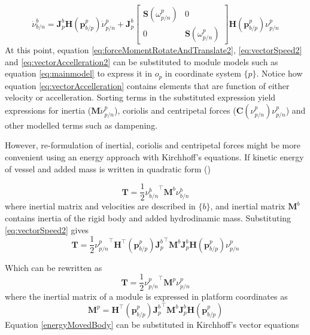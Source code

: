 \begin{equation}
\dot{\nu}_{b/n}^{b} = \textbf{J}_{p}^{b}  \textbf{H}(\textbf{p}_{b/p}^{p}) \dot{\nu}_{p/n}^{p}  + \textbf{J}_{p}^{b} \begin{bmatrix}\textbf{S}(\omega_{p/n}^{p})&0\\0&\textbf{S}(\omega_{p/n}^{p})    \end{bmatrix}\textbf{H}(\textbf{p}_{b/p}^{p}) \nu_{p/n}^{p}
\label{eq:vectorAccelleration2}
\end{equation}
At this point, equation \ref{eq:forceMomentRotateAndTranslate2}, \ref{eq:vectorSpeed2} and \ref{eq:vectorAccelleration2} can be substituted to module models such as equation \ref{eq:mainmodel} to express it in $o_{p}$ in coordinate system $\{p\}$. Notice how equation \ref{eq:vectorAccelleration} contains elements that are function of either velocity or accelleration. Sorting terms in the substituted expression yield expressions for inertia ($\textbf{M}\dot{\nu}_{p/n}^{p}$), coriolis and centripetal forces ($\textbf{C}(\nu_{p/n}^{p})\nu_{p/n}^{p}$) and other modelled terms such as dampening.


However, re-formulation of inertial, coriolis and centripetal forces might be more convenient using an energy approach with Kirchhoff’s equations. If kinetic energy of vessel and added mass is written in quadratic form (\citet{kirchhoff1869bewegung})

\begin{equation}
	\textbf{T} = \frac{1}{2} {\nu_{b/n}^{b}}^{\top} \textbf{M}^{b} \nu_{b/n}^{b}
\end{equation}
where inertial matrix and velocities are described in $\{b\}$, and inertial matrix $\textbf{M}^{b}$ contains inertia of the rigid body and added hydrodinamic mass. Substituting \ref{eq:vectorSpeed2} gives
\begin{equation}
\textbf{T} = \frac{1}{2} {\nu_{p/n}^{p}}^{\top} \textbf{H}^{\top}(\textbf{p}_{b/p}^{p}){\textbf{J}_{p}^{b}}^{\top}  \textbf{M}^{b} \textbf{J}_{p}^{b} \textbf{H}(\textbf{p}_{b/p}^{p}) \nu_{p/n}^{p}
\end{equation}

Which can be rewritten as
\begin{equation}
\textbf{T} = \frac{1}{2} {\nu_{p/n}^{p}}^{\top}\textbf{M}^{p} \nu_{p/n}^{p}
\label{energyMovedBody}
\end{equation}
where the inertial matrix of a module is expressed in platform coordinates as
\begin{equation}
\textbf{M}^{p} =  \textbf{H}^{\top}(\textbf{p}_{b/p}^{p}){\textbf{J}_{p}^{b}}^{\top}  \textbf{M}^{b} \textbf{J}_{p}^{b} \textbf{H}(\textbf{p}_{b/p}^{p})
\label{eq:InertialMatrixTransposed}
\end{equation}
Equation \ref{energyMovedBody} can be substituted in Kirchhoff's vector equations \citet{kirchhoff1869bewegung}

